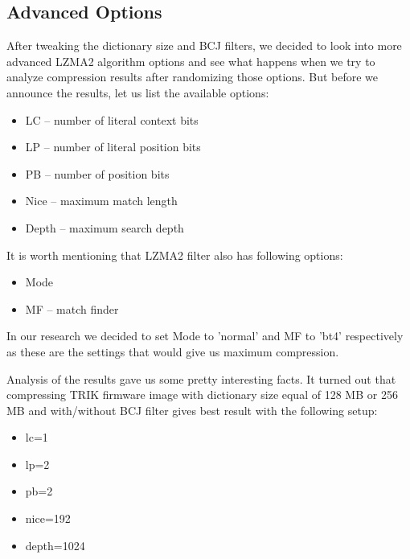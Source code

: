 \documentclass[conference]{IEEEtran}
\begin{document}
\subsection{Advanced Options}

After tweaking the dictionary size and BCJ filters, we decided to look into more advanced LZMA2 algorithm options and see what happens when we try to analyze compression results after randomizing those options. But before we announce the results, let us list the available options:

\begin{itemize}
\item LC -- number of literal context bits 
\item LP -- number of literal position bits 
\item PB -- number of position bits 
\item Nice -- maximum match length 
\item Depth -- maximum search depth 
\end{itemize}

It is worth mentioning that LZMA2 filter also has following options: 

\begin{itemize}
\item Mode
\item MF -- match finder
\end{itemize}

In our research we decided to set Mode to 'normal' and MF to 'bt4' respectively as these are the settings that would give us maximum compression.

Analysis of the results gave us some pretty interesting facts. It turned out that compressing TRIK firmware image with dictionary size equal of 128 MB or 256 MB and with/without BCJ filter gives best result with the following setup:
\begin{itemize}
\item lc=1
\item lp=2
\item pb=2
\item nice=192
\item depth=1024
\end{itemize}
\end{document}

